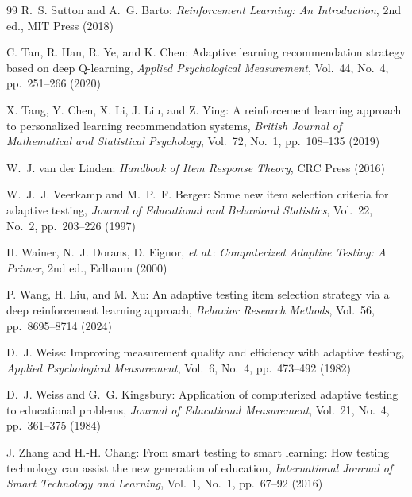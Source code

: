 \documentclass[dvipdfmx,a4j]{jarticle}
\begin{document}
\begin{thebibliography}{99}
R.~S. Sutton and A.~G. Barto:
\textit{Reinforcement Learning: An Introduction},
2nd ed., MIT Press (2018)

C. Tan, R. Han, R. Ye, and K. Chen:
Adaptive learning recommendation strategy based on deep Q-learning,
\textit{Applied Psychological Measurement}, Vol.~44, No.~4, pp.~251--266 (2020)

X. Tang, Y. Chen, X. Li, J. Liu, and Z. Ying:
A reinforcement learning approach to personalized learning recommendation systems,
\textit{British Journal of Mathematical and Statistical Psychology},
Vol.~72, No.~1, pp.~108--135 (2019)

W.~J. van der Linden:
\textit{Handbook of Item Response Theory},
CRC Press (2016)

W.~J.~J. Veerkamp and M.~P.~F. Berger:
Some new item selection criteria for adaptive testing,
\textit{Journal of Educational and Behavioral Statistics},
Vol.~22, No.~2, pp.~203--226 (1997)

H. Wainer, N.~J. Dorans, D. Eignor, \textit{et al}.:
\textit{Computerized Adaptive Testing: A Primer},
2nd ed., Erlbaum (2000)

P. Wang, H. Liu, and M. Xu:
An adaptive testing item selection strategy via a deep reinforcement learning approach,
\textit{Behavior Research Methods}, Vol.~56, pp.~8695--8714 (2024)

D.~J. Weiss:
Improving measurement quality and efficiency with adaptive testing,
\textit{Applied Psychological Measurement}, Vol.~6, No.~4, pp.~473--492 (1982)

D.~J. Weiss and G.~G. Kingsbury:
Application of computerized adaptive testing to educational problems,
\textit{Journal of Educational Measurement}, Vol.~21, No.~4, pp.~361--375 (1984)

J. Zhang and H.-H. Chang:
From smart testing to smart learning: How testing technology can assist the new generation of education,
\textit{International Journal of Smart Technology and Learning},
Vol.~1, No.~1, pp.~67--92 (2016)

\end{thebibliography}
\end{document}
